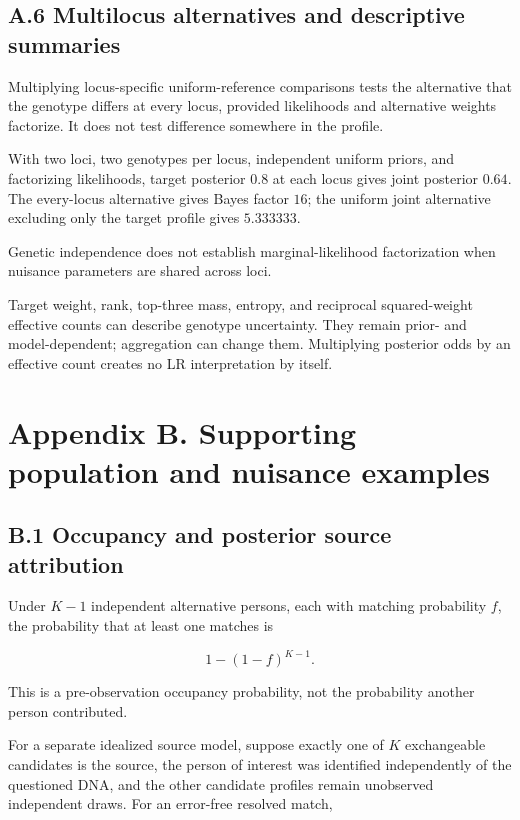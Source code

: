 \documentclass[
]{article}
\begin{document}
\subsection{A.6 Multilocus alternatives and descriptive
summaries}\label{a.6-multilocus-alternatives-and-descriptive-summaries}

Multiplying locus-specific uniform-reference comparisons tests the
alternative that the genotype differs at every locus, provided
likelihoods and alternative weights factorize. It does not test
difference somewhere in the profile.

With two loci, two genotypes per locus, independent uniform priors, and
factorizing likelihoods, target posterior \(0.8\) at each locus gives
joint posterior \(0.64\). The every-locus alternative gives Bayes factor
\(16\); the uniform joint alternative excluding only the target profile
gives \(5.333333\).

Genetic independence does not establish marginal-likelihood
factorization when nuisance parameters are shared across loci.

Target weight, rank, top-three mass, entropy, and reciprocal
squared-weight effective counts can describe genotype uncertainty. They
remain prior- and model-dependent; aggregation can change them.
Multiplying posterior odds by an effective count creates no LR
interpretation by itself.

\section{Appendix B. Supporting population and nuisance
examples}\label{appendix-b.-supporting-population-and-nuisance-examples}

\subsection{B.1 Occupancy and posterior source
attribution}\label{b.1-occupancy-and-posterior-source-attribution}

Under \(K-1\) independent alternative persons, each with matching
probability \(f\), the probability that at least one matches is

\[
1-(1-f)^{K-1}.
\]

This is a pre-observation occupancy probability, not the probability
another person contributed.

For a separate idealized source model, suppose exactly one of \(K\)
exchangeable candidates is the source, the person of interest was
identified independently of the questioned DNA, and the other candidate
profiles remain unobserved independent draws. For an error-free resolved
match,
\end{document}
